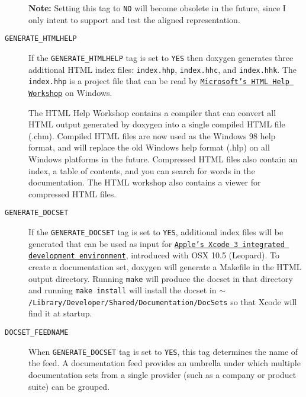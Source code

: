 \begin{description}
{\bf Note:} Setting this tag to {\tt NO} will become obsolete in the future, since I only intent to support and test the aligned representation.

\label{config_cfg_generate_htmlhelp}
\hypertarget{config_cfg_generate_htmlhelp}{}
 \item[{\tt GENERATE\_\-HTMLHELP} ] If the {\tt GENERATE\_\-HTMLHELP} tag is set to {\tt YES} then doxygen generates three additional HTML index files: {\tt index.hhp}, {\tt index.hhc}, and {\tt index.hhk}. The {\tt index.hhp} is a project file that can be read by \href{http://msdn.microsoft.com/library/default.asp?url=/library/en-us/htmlhelp/html/vsconHH1Start.asp}{\tt Microsoft's HTML Help Workshop} on Windows.

The HTML Help Workshop contains a compiler that can convert all HTML output generated by doxygen into a single compiled HTML file (.chm). Compiled HTML files are now used as the Windows 98 help format, and will replace the old Windows help format (.hlp) on all Windows platforms in the future. Compressed HTML files also contain an index, a table of contents, and you can search for words in the documentation. The HTML workshop also contains a viewer for compressed HTML files.

\label{config_cfg_generate_docset}
\hypertarget{config_cfg_generate_docset}{}
 \item[{\tt GENERATE\_\-DOCSET} ] If the {\tt GENERATE\_\-DOCSET} tag is set to {\tt YES}, additional index files will be generated that can be used as input for \href{http://developer.apple.com/tools/xcode/}{\tt Apple's Xcode 3 integrated development environment}, introduced with OSX 10.5 (Leopard). To create a documentation set, doxygen will generate a Makefile in the HTML output directory. Running {\tt make} will produce the docset in that directory and running {\tt make install} will install the docset in {\tt $\sim$/Library/Developer/Shared/Documentation/DocSets} so that Xcode will find it at startup.

\label{config_cfg_docset_feedname}
\hypertarget{config_cfg_docset_feedname}{}
 \item[{\tt DOCSET\_\-FEEDNAME} ] When {\tt GENERATE\_\-DOCSET} tag is set to {\tt YES}, this tag determines the name of the feed. A documentation feed provides an umbrella under which multiple documentation sets from a single provider (such as a company or product suite) can be grouped.


\end{description}

